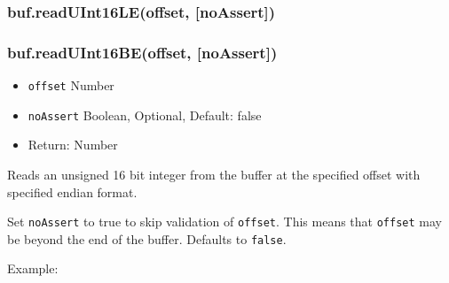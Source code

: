 \begin{Shaded}
\begin{Highlighting}[]
  \NormalTok{);}

\NormalTok{buf[}\NormalTok{] = }\NormalTok{;}
\NormalTok{buf[}\NormalTok{] = }\NormalTok{;}
\NormalTok{buf[}\NormalTok{] = }\NormalTok{;}
\NormalTok{buf[}\NormalTok{] = }\NormalTok{;}

 
  \NormalTok{(}
\NormalTok{\}}

\end{Highlighting}
\end{Shaded}

\subsubsection{buf.readUInt16LE(offset, {[}noAssert{]})}

\subsubsection{buf.readUInt16BE(offset, {[}noAssert{]})}

\begin{itemize}
\item
  \texttt{offset} Number
\item
  \texttt{noAssert} Boolean, Optional, Default: false
\item
  Return: Number
\end{itemize}

Reads an unsigned 16 bit integer from the buffer at the specified offset
with specified endian format.

Set \texttt{noAssert} to true to skip validation of \texttt{offset}.
This means that \texttt{offset} may be beyond the end of the buffer.
Defaults to \texttt{false}.

Example:

